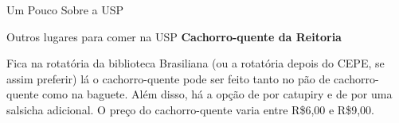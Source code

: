 \begin{secao}{Um Pouco Sobre a USP}
\begin{subsecao}{Outros lugares para comer na USP}
{\bf Cachorro-quente da Reitoria}

Fica na rotatória da biblioteca Brasiliana (ou a rotatória depois do CEPE, se assim preferir)
lá o cachorro-quente pode ser feito tanto no pão de cachorro-quente como na baguete. Além disso,
há a opção de por catupiry e de por uma salsicha adicional. O preço do cachorro-quente varia
entre R\$6,00 e R\$9,00.

\end{subsecao}

\end{secao}
